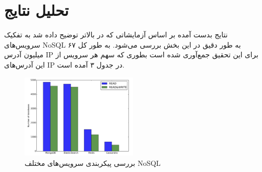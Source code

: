 \documentclass[10pt, a4paper]{article}
\begin{document}
\newpage

\section{تحلیل نتایج}

نتایج بدست آمده بر اساس آزمایشاتی که در بالاتر توضیح داده شد به تفکیک سرویس‌های
NoSQL به طور دقیق در این بخش بررسی می‌شود. به طور کل ۶۷ میلیون آدرس IP برای این
تحقیق جمع‌آوری شده است بطوری که سهم هر سرویس از این آدرس‌های IP در جدول ۳ آمده
است.

\begin{LTR}
    \begin{table}[h]
        \centering
        \begin{RTL}
            \caption{آدرس‌های IP یافت شده بین بازه اکتبر ۲۰۱۹ تا مارچ ۲۰۲۰}
        \end{RTL}
    \end{table}
\end{LTR}

\begin{figure}
    \centering
    \includegraphics[width=0.5\textwidth]{res/a.png}
    \caption{بررسی پیکربندی سرویس‌های مختلف NoSQL}
    \label{fig: diagram}
\end{figure}
\end{document}
